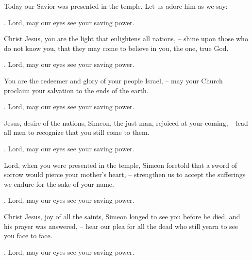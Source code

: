 \lettrine[loversize=0.15,lines=2]{T}{}oday our Savior was presented in the temple. Let us adore him as we say:
\par \Rbar. Lord, may our eyes see your saving power.

Christ Jesus, you are the light that enlightens all nations,
– shine upon those who do not know you, that they may come to believe in you, the one, true God.
\par \Rbar. Lord, may our eyes see your saving power.

You are the redeemer and glory of your people Israel,
– may your Church proclaim your salvation to the ends of the earth.
\par \Rbar. Lord, may our eyes see your saving power.

Jesus, desire of the nations, Simeon, the just man, rejoiced at your coming,
– lead all men to recognize that you still come to them.
\par \Rbar. Lord, may our eyes see your saving power.

Lord, when you were presented in the temple, Simeon foretold that a sword of sorrow would pierce your mother’s heart,
– strengthen us to accept the sufferings we endure for the sake of your name.
\par \Rbar. Lord, may our eyes see your saving power.

Christ Jesus, joy of all the saints, Simeon longed to see you before he died, and his prayer was answered,
– hear our plea for all the dead who still yearn to see you face to face.
\par \Rbar. Lord, may our eyes see your saving power.
